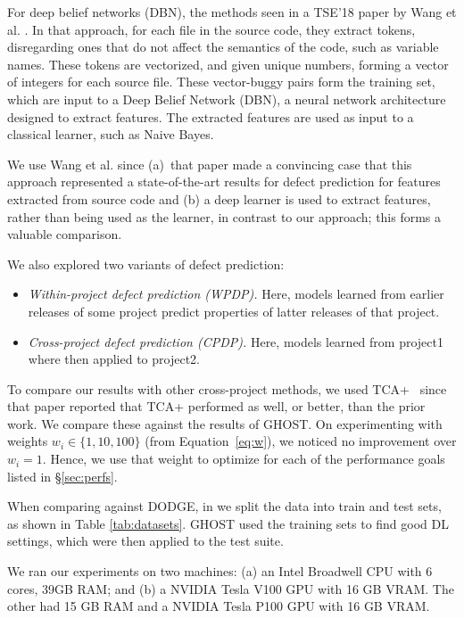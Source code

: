 \documentclass[10pt,compsoc,twocolumn]{IEEEtran}
\newcommand{\bi}{\begin{itemize}}
\newcommand{\ei}{\end{itemize}}
\begin{document}
 For deep belief networks (DBN), the methods seen in a TSE'18 paper  by
Wang et al. \cite{wang2018deep}. 
In that approach,
for each file in the source code, they extract tokens, disregarding ones that do not affect the semantics of the code, such as variable names. 
These tokens are vectorized, and given unique numbers, forming a vector of integers for each source file. 
These vector-buggy pairs form the training set, which are input to a Deep Belief Network (DBN), a neural network architecture designed to extract features. The extracted features are used as input to a classical learner, such as Naive Bayes. 

We    use Wang et al. since (a)~that paper made a convincing case that this approach represented a  state-of-the-art results for defect prediction for
 features extracted from source code and  (b) a deep learner is used to extract features, rather than being used as the learner, in contrast to our approach; this forms a valuable comparison.


We also explored two variants of defect prediction:
\bi
\item 
{\em Within-project defect prediction (WPDP).} Here, models
learned from earlier releases of some project  predict properties
of latter releases of that project.
\item
{\em Cross-project defect prediction (CPDP).} Here, models learned
from project1 where then applied to project2. 
\ei
To compare our results
with other cross-project methods, we used TCA+~\cite{liu2019two} since
that paper reported that TCA+ performed as well, or better, than the prior work.
We compare these against the results of GHOST. On experimenting with weights $w_i\in\{1, 10,  100\}$ (from Equation~\ref{eq:w}), we noticed no improvement over $w_i=1$. Hence, we use that weight to optimize for   each of the  performance goals
listed in \S\ref{sec:perfs}.

When comparing against DODGE, in  we split the data into train and test sets, as shown in Table \ref{tab:datasets}.  GHOST used the training sets to find good DL settings, which were then applied to the test suite.


We ran our experiments on two machines:
(a) an Intel Broadwell CPU with 6 cores, 39GB RAM; and (b) a NVIDIA Tesla V100 GPU with 16 GB VRAM. The other had 15 GB RAM and a NVIDIA Tesla P100 GPU with 16 GB VRAM.
\end{document}
